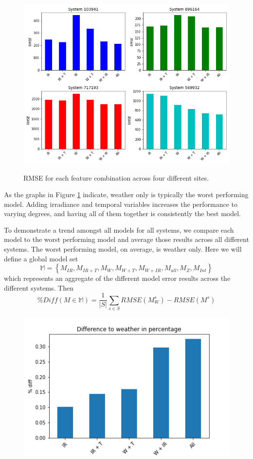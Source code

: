 \documentclass[11pt, fullpage,letterpaper]{article}
\begin{document}
\begin{figure}[!htb]
    \includegraphics[width=\textwidth]{4-1}
    \label{4-1}
    \caption{RMSE for each feature combination across four different sites.}
\end{figure}

As the graphs in Figure \ref{4-1} indicate, weather only is typically the worst performing model. Adding irradiance and temporal variables increases the performance to varying degrees, and having all of them together is consistently the best model.

To demonstrate a trend amongst all models for all systems, we compare each model to the worst performing model and average those results across all different systems. The worst performing model, on average, is weather only. Here we will define a global model set $$\mathbb{M} = \left\{ M_{IR}, M_{IR+T}, M_{W}, M_{W+T}, M_{W+IR}, M_{all}, M_{Z}, M_{Int} \right\}$$ which represents an aggregate of the different model error results across the different systems. Then 
\[
    \%Diff(M \in \mathbb{M}) = \frac{1}{|S|} \sum_{s \in S} RMSE(M^s_W) - RMSE(M^s)
\]

\begin{figure}[!htb]
    \centering
    \includegraphics[scale=0.75]{../plots/regression_report/4-2}
    \caption{}
    \label{4-2}
\end{figure}
\end{document}
